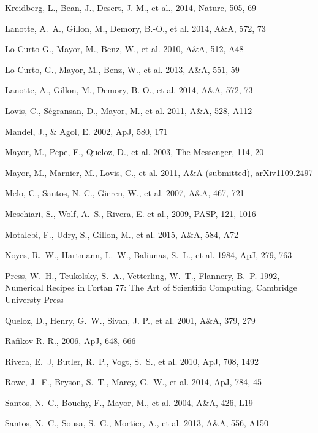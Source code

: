 \documentclass[traditabstract]{aa}
\begin{document}
\begin{thebibliography}{}
 Kreidberg, L., Bean, J., Desert, J.-M., et al., 2014, Nature, 505, 69
   
 Lanotte, A.~A., Gillon, M., Demory, B.-O., et al. 2014, A\&A, 572, 73

 Lo Curto G., Mayor, M., Benz, W., et al. 2010, A\&A, 512, A48

 Lo Curto, G., Mayor, M., Benz, W., et al. 2013, A\&A, 551, 59
   
 Lanotte, A., Gillon, M., Demory, B.-O., et al. 2014, A\&A, 572, 73

 Lovis, C., S\'egransan, D., Mayor, M., et al. 2011, A\&A, 528, A112

 Mandel, J., \& Agol, E. 2002, ApJ, 580, 171

 Mayor, M., Pepe, F., Queloz, D., et al. 2003, The Messenger, 114, 20

 Mayor, M., Marnier, M., Lovis, C., et al. 2011, A\&A (submitted), arXiv1109.2497

 Melo, C., Santos, N. C., Gieren, W., et al. 2007, A\&A, 467, 721

 Meschiari, S., Wolf, A.~S., Rivera, E. et al., 2009, PASP, 121, 1016

 Motalebi, F., Udry, S., Gillon, M., et al. 2015, A\&A, 584, A72

 Noyes, R.~W., Hartmann, L.~W., Baliunas, S.~L., et al. 1984, ApJ, 279, 763
   
  Press, W.~H., Teukolsky, S.~A., Vetterling, W.~T., Flannery, B.~P. 1992, Numerical Recipes in Fortan 77: The Art of Scientific Computing, Cambridge Universty Press

 Queloz, D., Henry, G.~W., Sivan, J. P., et al. 2001, A\&A, 379, 279

 Rafikov R. R., 2006, ApJ, 648, 666

 Rivera, E.~J, Butler, R.~P., Vogt, S.~S., et al. 2010, ApJ, 708, 1492

 Rowe, J.~F., Bryson, S.~T., Marcy, G.~W., et al. 2014, ApJ, 784, 45
   
 Santos, N.~C., Bouchy, F., Mayor, M., et al. 2004, A\&A, 426, L19
      
  Santos, N.~C., Sousa, S.~G., Mortier, A., et al. 2013, A\&A, 556, A150


\end{thebibliography}
\end{document}
